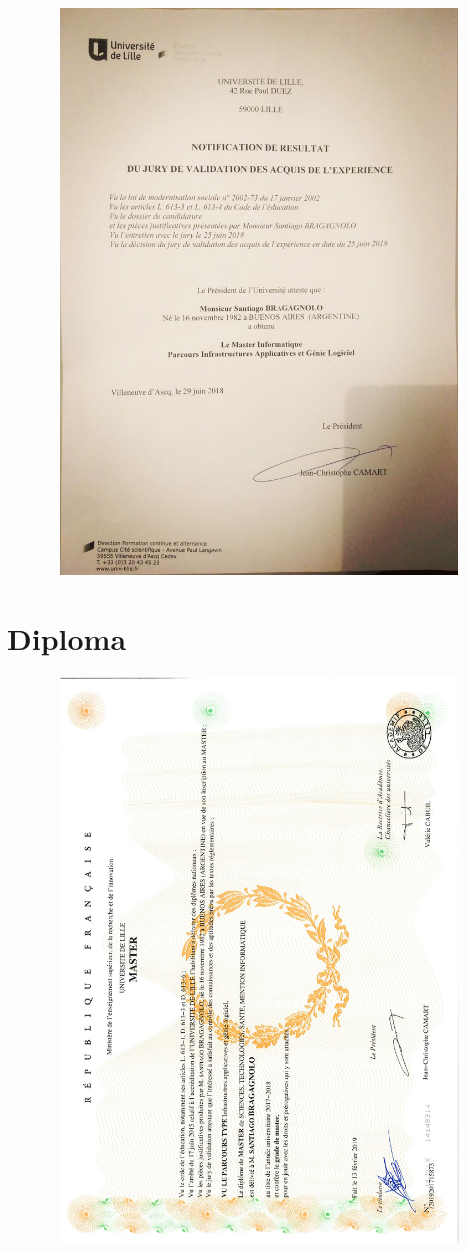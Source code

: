 \documentclass[11pt]{article} %
\begin{document}
 \includegraphics[width=15cm,height=15cm,keepaspectratio]{docs/Doc4-VAE.jpeg}   
  
\section{Diploma} 

 \includegraphics[width=15cm,height=15cm,keepaspectratio]{docs/Doc5-MasterSanti.pdf}   
\end{document}
